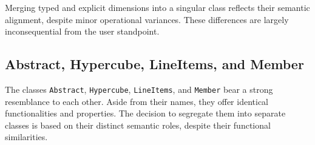 Merging typed and explicit dimensions into a singular class reflects their semantic alignment,
despite minor operational variances.
These differences are largely inconsequential from the user standpoint.



\subsection{Abstract, Hypercube, LineItems, and Member}

The classes \texttt{Abstract}, \texttt{Hypercube}, \texttt{LineItems}, and \texttt{Member} bear a strong resemblance to each other.
Aside from their names, they offer identical functionalities and properties.
The decision to segregate them into separate classes is based on their distinct semantic roles,
despite their functional similarities.
